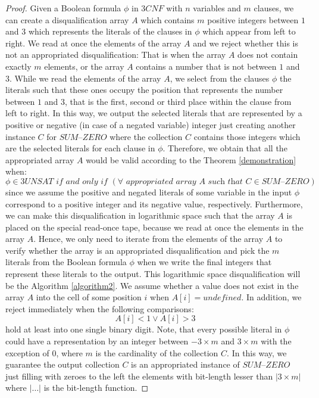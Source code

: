 \documentclass[a4paper,UKenglish,cleveref, autoref]{lipics-v2019}
\begin{document}
\begin{proof}
Given a Boolean formula $\phi$ in $3CNF$ with $n$ variables and $m$ clauses, we can create a disqualification array $A$ which contains $m$ positive integers between $1$ and $3$ which represents the literals of the clauses in $\phi$ which appear from left to right. We read at once the elements of the array $A$ and we reject whether this is not an appropriated disqualification: That is when the array $A$ does not contain exactly $m$ elements, or the array $A$ contains a number that is not between $1$ and $3$. While we read the elements of the array $A$, we select from the clauses $\phi$ the literals such that these ones occupy the position that represents the number between $1$ and $3$, that is the first, second or third place within the clause from left to right. In this way, we output the selected literals that are represented by a positive or negative (in case of a negated variable) integer just creating another instance $C$ for $\textit{SUM--ZERO}$ where the collection $C$ contains those integers which are the selected literals for each clause in $\phi$. Therefore, we obtain that all the appropriated array $A$ would be valid according to the Theorem \ref{demonstration} when:
\[\phi \in 3UNSAT \textit{ if and only if } (\forall \textit{ appropriated array } A \textit{ such that } C \in \textit{SUM--ZERO})\]
since we assume the positive and negated literals of some variable in the input $\phi$ correspond to a positive integer and its negative value, respectively. Furthermore, we can make this disqualification in logarithmic space such that the array $A$ is placed on the special read-once tape, because we read at once the elements in the array $A$. Hence, we only need to iterate from the elements of the array $A$ to verify whether the array is an appropriated disqualification and pick the $m$ literals from the Boolean formula $\phi$ when we write the final integers that represent these literals to the output. This logarithmic space disqualification will be the Algorithm \ref{algorithm2}. We assume whether a value does not exist in the array $A$ into the cell of some position $i$ when $A[i] = \textit{undefined}$. In addition, we reject immediately when the following comparisons:
\[A[i] < 1 \vee A[i] > 3\]
hold at least into one single binary digit. Note, that every possible literal in $\phi$ could have a representation by an integer between $-3 \times m$ and $3 \times m$ with the exception of $0$, where $m$ is the cardinality of the collection $C$. In this way, we guarantee the output collection $C$ is an appropriated instance of $\textit{SUM--ZERO}$ just filling with zeroes to the left the elements with bit-length lesser than $|3 \times m|$ where $|\ldots|$ is the bit-length function.


\end{proof}
\end{document}
